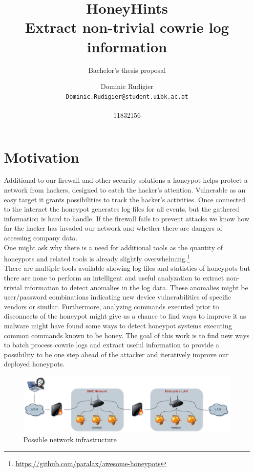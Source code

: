 \documentclass[fontsize=11pt, paper=a4, parskip=half]{scrartcl}
\title{
	HoneyHints \\ Extract non-trivial cowrie log information
}
\subtitle{Bachelor's thesis proposal}
\author{
	Dominic Rudigier
	\\
	\texttt{Dominic.Rudigier@student.uibk.ac.at}  
	\\ \\
	{11832156}
}
\begin{document}
\maketitle
\newpage
\section{Motivation}
Additional to our firewall and other security solutions a honeypot helps protect a network from hackers, designed to catch the hacker's attention. Vulnerable as an easy target it grants possibilities to track the hacker's activities. Once connected to the internet the honeypot generates log files for all events, but the gathered information is hard to handle. If the firewall fails to prevent attacks we know how far the hacker has invaded our network and whether there are dangers of accessing company data. \\
One might ask why there is a need for additional tools as the quantity of honeypots and related tools is already slightly overwhelming.\footnote{\url{https://github.com/paralax/awesome-honeypots}} \\
There are multiple tools available showing log files and statistics of honeypots but there are none to perform an intelligent and useful analyzation to extract non-trivial information to detect anomalies in the log data. These anomalies might be user/password combinations indicating new device vulnerabilities of specific vendors or similar. Furthermore, analyzing commands executed prior to disconnects of the honeypot might give us a chance to find ways to improve it as malware might have found some ways to detect honeypot systems executing common commands known to be honey. The goal of this work is to find new ways to batch process cowrie logs and extract useful information to provide a possibility to be one step ahead of the attacker and iteratively improve our deployed honeypots. 

\begin{figure}[ht!]
	\centering
	\includegraphics[width=\textwidth]{img/DMZ_Honeypot.png}
	\caption{Possible network infrastructure}
	\label{fig1}
\end{figure}
\end{document}
